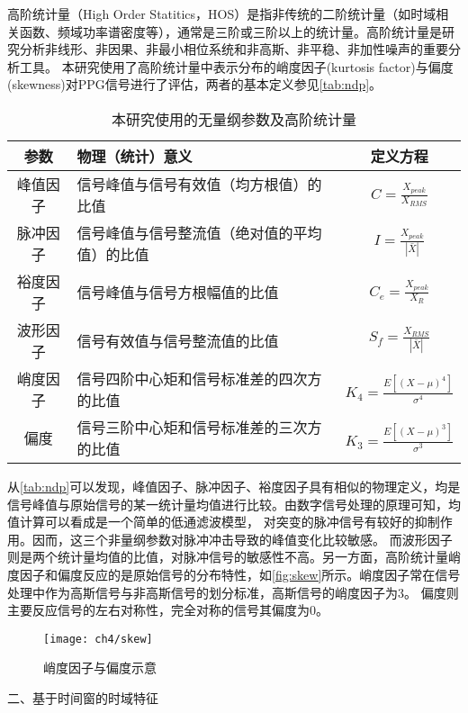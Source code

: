 高阶统计量（High Order Statitics，HOS）是指非传统的二阶统计量（如时域相关函数、频域功率谱密度等），通常是三阶或三阶以上的统计量\cite{Zhang2002,Tu2013}。高阶统计量是研究分析非线形、非因果、非最小相位系统和非高斯、非平稳、非加性噪声的重要分析工具。
本研究使用了高阶统计量中表示分布的峭度因子(kurtosis factor)与偏度(skewness)对PPG信号进行了评估，两者的基本定义参见\autoref{tab:ndp}。
\begin{table}[htbp]
    \centering
    \caption{\label{tab:ndp}本研究使用的无量纲参数及高阶统计量}
    \begin{tabularx}{\linewidth}{cX<{\centering}c}
        \toprule
        \textbf{参数}&\textbf{物理（统计）意义}&\textbf{定义方程}\\
        \midrule
        峰值因子&信号峰值与信号有效值（均方根值）的比值& $C=\frac{X_{peak}}{X_{RMS}}$      \\
        脉冲因子&信号峰值与信号整流值（绝对值的平均值）的比值&$I=\frac{X_{peak}}{|\bar{X}|}$      \\
        裕度因子&信号峰值与信号方根幅值的比值&$C_e=\frac{X_{peak}}{X_R}$       \\
        波形因子&信号有效值与信号整流值的比值&$S_f=\frac{X_{RMS}}{|\bar{X}|}$      \\
        峭度因子&信号四阶中心矩和信号标准差的四次方的比值&$K_4=\frac{E[(X-\mu)^4]}{\sigma^4}$      \\
        偏度&信号三阶中心矩和信号标准差的三次方的比值&$K_3=\frac{E[(X-\mu)^3]}{\sigma^3}$      \\
        \bottomrule
    \end{tabularx}
\end{table}

从\autoref{tab:ndp}可以发现，峰值因子、脉冲因子、裕度因子具有相似的物理定义，均是信号峰值与原始信号的某一统计量均值进行比较。由数字信号处理的原理可知，均值计算可以看成是一个简单的低通滤波模型，
对突变的脉冲信号有较好的抑制作用。因而，这三个非量纲参数对脉冲冲击导致的峰值变化比较敏感。
而波形因子则是两个统计量均值的比值，对脉冲信号的敏感性不高。另一方面，高阶统计量峭度因子和偏度反应的是原始信号的分布特性，如\autoref{fig:skew}所示。峭度因子常在信号处理中作为高斯信号与非高斯信号的划分标准，高斯信号的峭度因子为3。
偏度则主要反应信号的左右对称性，完全对称的信号其偏度为0。
\begin{figure}[htbp]
    \centering
    \texttt{[image: ch4/skew]}
    \caption{\label{fig:skew}峭度因子与偏度示意}
\end{figure}

二、基于时间窗的时域特征

